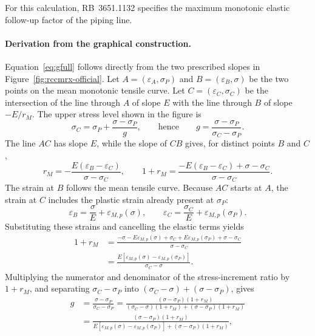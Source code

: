 \documentclass[10pt,a4paper]{article}
\begin{document}
For this calculation, RB~3651.1132 specifies the maximum monotonic elastic follow-up factor of the piping line.

\paragraph{Derivation from the graphical construction.}
Equation~\eqref{eq:gfull} follows directly from the two prescribed slopes in Figure~\ref{fig:rccmrx-official}. Let $A=(\varepsilon_A,\sigma_P)$ and $B=(\varepsilon_B,\sigma)$ be the two points on the mean monotonic tensile curve. Let $C=(\varepsilon_C,\sigma_C)$ be the intersection of the line through $A$ of slope $E$ with the line through $B$ of slope $-E/r_M$. The upper stress level shown in the figure is
\begin{equation*}
\sigma_C=\sigma_P+\frac{\sigma-\sigma_P}{g},
\qquad\text{hence}\qquad
g=\frac{\sigma-\sigma_P}{\sigma_C-\sigma_P}.
\end{equation*}
The line $AC$ has slope $E$, while the slope of $CB$ gives, for distinct points $B$ and $C$,
\begin{equation*}
r_M=-\frac{E(\varepsilon_B-\varepsilon_C)}{\sigma-\sigma_C},
\qquad
1+r_M=
\frac{-E(\varepsilon_B-\varepsilon_C)+\sigma-\sigma_C}
{\sigma-\sigma_C}.
\end{equation*}
The strain at $B$ follows the mean tensile curve. Because $AC$ starts at $A$, the strain at $C$ includes the plastic strain already present at $\sigma_P$:
\begin{equation*}
\varepsilon_B=\frac{\sigma}{E}+\varepsilon_{M,p}(\sigma),
\qquad
\varepsilon_C=\frac{\sigma_C}{E}+\varepsilon_{M,p}(\sigma_P).
\end{equation*}
Substituting these strains and cancelling the elastic terms yields
\begin{align*}
1+r_M
&=\frac{-\sigma-E\varepsilon_{M,p}(\sigma)+\sigma_C
+E\varepsilon_{M,p}(\sigma_P)+\sigma-\sigma_C}{\sigma-\sigma_C}\\
&=\frac{E[\varepsilon_{M,p}(\sigma)-\varepsilon_{M,p}(\sigma_P)]}
{\sigma_C-\sigma}.
\end{align*}
Multiplying the numerator and denominator of the stress-increment ratio by $1+r_M$, and separating $\sigma_C-\sigma_P$ into $(\sigma_C-\sigma)+(\sigma-\sigma_P)$, gives
\begin{align*}
g
&=\frac{\sigma-\sigma_P}{\sigma_C-\sigma_P}
=\frac{(\sigma-\sigma_P)(1+r_M)}
{(\sigma_C-\sigma)(1+r_M)+(\sigma-\sigma_P)(1+r_M)}\\
&=\frac{(\sigma-\sigma_P)(1+r_M)}
{E[\varepsilon_{M,p}(\sigma)-\varepsilon_{M,p}(\sigma_P)]
+(\sigma-\sigma_P)(1+r_M)},
\end{align*}
\end{document}
